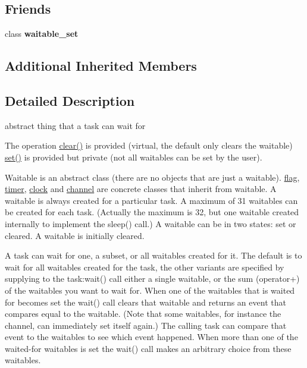\subsection*{Friends}
\begin{DoxyCompactItemize}
\item 
class {\bfseries waitable\+\_\+set}\hypertarget{classrtos_1_1waitable_a0ee29d8961a0b67cea2c3fa76da116da}{}\label{classrtos_1_1waitable_a0ee29d8961a0b67cea2c3fa76da116da}

\end{DoxyCompactItemize}
\subsection*{Additional Inherited Members}


\subsection{Detailed Description}
abstract thing that a task can wait for 

The operation \hyperlink{classrtos_1_1waitable_ac4630398f50ba7e661a64bfc491ffa10}{clear()} is provided (virtual, the default only clears the waitable) \hyperlink{classrtos_1_1waitable_a3f1c5cfb702d4bd50b91fab1ab355bc0}{set()} is provided but private (not all waitables can be set by the user).

Waitable is an abstract class (there are no objects that are just a waitable). \hyperlink{classrtos_1_1flag}{flag}, \hyperlink{classrtos_1_1timer}{timer}, \hyperlink{classrtos_1_1clock}{clock} and \hyperlink{classrtos_1_1channel}{channel} are concrete classes that inherit from waitable. A waitable is always created for a particular task. A maximum of 31 waitables can be created for each task. (Actually the maximum is 32, but one waitable created internally to implement the sleep() call.) A waitable can be in two states\+: set or cleared. A waitable is initially cleared.

A task can wait for one, a subset, or all waitables created for it. The default is to wait for all waitables created for the task, the other variants are specified by supplying to the task\+:wait() call either a single waitable, or the sum (operator+) of the waitables you want to wait for. When one of the waitables that is waited for becomes set the wait() call clears that waitable and returns an event that compares equal to the waitable. (Note that some waitables, for instance the channel, can immediately set itself again.) The calling task can compare that event to the waitables to see which event happened. When more than one of the waited-\/for waitables is set the wait() call makes an arbitrary choice from these waitables. 


